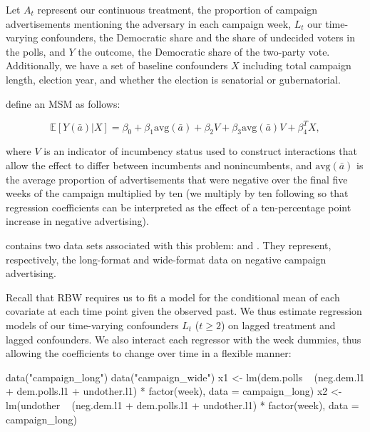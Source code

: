 Let \(A_{t}\) represent our continuous treatment, the proportion of
campaign advertisements mentioning the adversary in each campaign week,
\(L_{t}\) our time-varying confounders, the Democratic share and the
share of undecided voters in the polls, and \(Y\) the outcome, the
Democratic share of the two-party vote. Additionally, we have a set of
baseline confounders \(X\) including total campaign length, election
year, and whether the election is senatorial or gubernatorial.

\citet{zhouResidualBalancingMethod2020a} define an MSM as follows:

\begin{equation}
\label{eq:15}
\mathbb{E}[Y(\bar{a})|X]=\beta_{0}+\beta_{1}\text{avg}(\bar{a})+\beta_{2}V+\beta_{3}\text{avg}(\bar{a})V+\beta_{4}^{T}X,
\end{equation}

where \(V\) is an indicator of incumbency status used to construct
interactions that allow the effect to differ between incumbents and
nonincumbents, and \(\text{avg}(\bar{a})\) is the average proportion of
advertisements that were negative over the final five weeks of the
campaign multiplied by ten (we multiply by ten following
\citet{zhouResidualBalancingMethod2020a} so that regression coefficients
can be interpreted as the effect of a ten-percentage point increase in
negative advertising).

 contains two data sets associated with this problem:
 and . They represent,
respectively, the long-format and wide-format data on negative campaign
advertising.

Recall that RBW requires us to fit a model for the conditional mean of
each covariate at each time point given the observed past. We thus
estimate regression models of our time-varying confounders \(L_{t}\)
(\(t\ge2\)) on lagged treatment and lagged confounders. We also interact
each regressor with the week dummies, thus allowing the coefficients to
change over time in a flexible manner:

\begin{Schunk}
\begin{Sinput}
data("campaign_long")
data("campaign_wide")
x1 <-
  lm(dem.polls ~ (neg.dem.l1 + dem.polls.l1 + undother.l1) * factor(week),
     data = campaign_long)
x2 <-
  lm(undother ~ (neg.dem.l1 + dem.polls.l1 + undother.l1) * factor(week),
     data = campaign_long)
\end{Sinput}
\end{Schunk}

